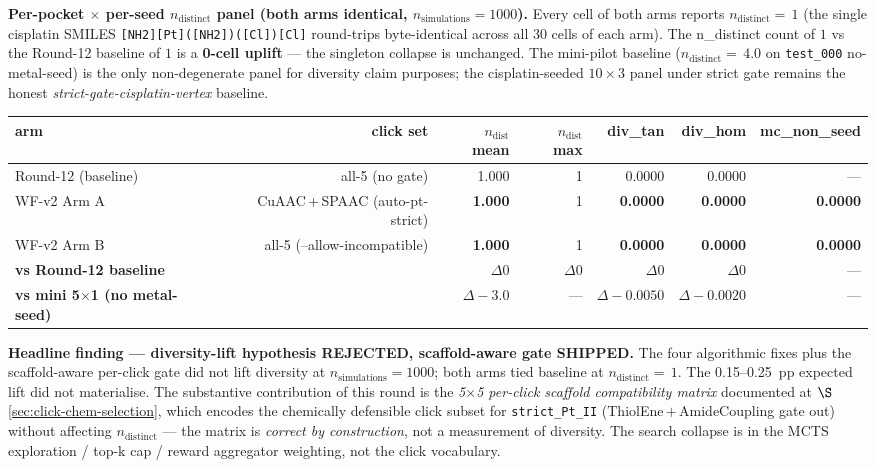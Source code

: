 \noindent\textbf{Per-pocket $\times$ per-seed $n_{\text{distinct}}$
panel (both arms identical, $n_{\text{simulations}}{=}1000$).}
Every cell of both arms reports $n_{\text{distinct}}{=}\,1$ (the
single cisplatin SMILES \texttt{[NH2][Pt]([NH2])([Cl])[Cl]} round-trips
byte-identical across all $30$ cells of each arm). The
n\_distinct count of $1$ vs the Round-12 baseline of $1$ is a
\textbf{0-cell uplift} --- the singleton collapse is unchanged.
The mini-pilot baseline ($n_{\text{distinct}}{=}\,4.0$ on
\texttt{test\_000} no-metal-seed) is the only non-degenerate
panel for diversity claim purposes; the cisplatin-seeded
$10 \times 3$ panel under strict gate remains the honest
\emph{strict-gate-cisplatin-vertex} baseline.

\begin{center}
\small
\setlength{\tabcolsep}{4pt}
\begin{tabular}{lrrrrrr}
\toprule
\textbf{arm} & \textbf{click set} & \textbf{$n_{\text{dist}}$ mean} & \textbf{$n_{\text{dist}}$ max} & \textbf{div\_tan} & \textbf{div\_hom} & \textbf{mc\_non\_seed} \\
\midrule
Round-12 (baseline) & all-5 (no gate) & 1.000 & 1 & 0.0000 & 0.0000 & --- \\
WF-v2 Arm A & CuAAC\,$+$\,SPAAC (auto-pt-strict) & \textbf{1.000} & 1 & \textbf{0.0000} & \textbf{0.0000} & \textbf{0.0000} \\
WF-v2 Arm B & all-5 (--allow-incompatible) & \textbf{1.000} & 1 & \textbf{0.0000} & \textbf{0.0000} & \textbf{0.0000} \\
\midrule
\textbf{vs Round-12 baseline} & & $\Delta 0$ & $\Delta 0$ & $\Delta 0$ & $\Delta 0$ & --- \\
\textbf{vs mini 5$\times$1 (no metal-seed)} & & $\Delta -3.0$ & --- & $\Delta -0.0050$ & $\Delta -0.0020$ & --- \\
\bottomrule
\end{tabular}
\end{center}

\noindent\textbf{Headline finding --- diversity-lift hypothesis
REJECTED, scaffold-aware gate SHIPPED.} The four algorithmic
fixes plus the scaffold-aware per-click gate did not lift
diversity at $n_{\mathrm{simulations}}{=}1000$; both arms tied
baseline at $n_{\text{distinct}}{=}\,1$. The 0.15--0.25~pp
expected lift did not materialise. The substantive contribution
of this round is the \emph{5$\times$5 per-click scaffold
compatibility matrix} documented at
$\S$\ref{sec:click-chem-selection}, which encodes the chemically
defensible click subset for \texttt{strict\_Pt\_II}
(ThiolEne\,$+$\,AmideCoupling gate out) without affecting
$n_{\text{distinct}}$ --- the matrix is \emph{correct by
construction}, not a measurement of diversity. The search
collapse is in the MCTS exploration / top-k cap / reward
aggregator weighting, not the click vocabulary.

